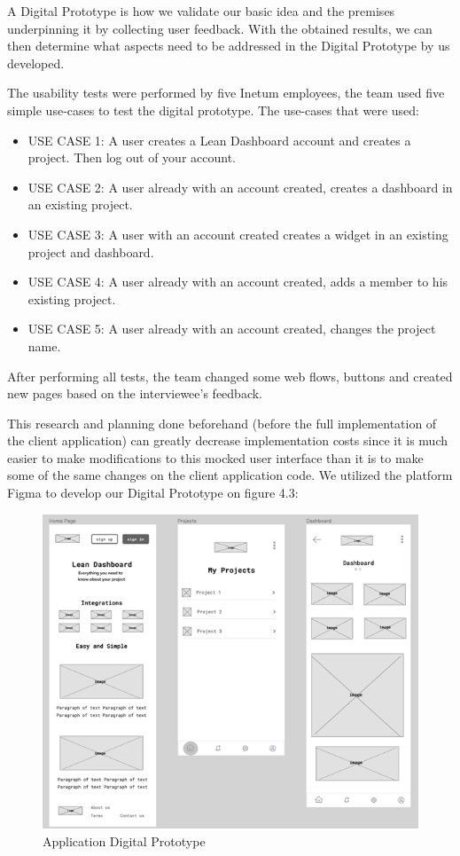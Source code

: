 \documentclass[a4paper,twoside,10pt]{report}
\begin{document}
A Digital Prototype is how we validate our basic idea and the premises underpinning it by collecting user feedback.
With the obtained results, we can then determine what aspects need to be addressed in the Digital Prototype by us developed.

The usability tests were performed by five Inetum employees, the team used five simple use-cases to test the digital prototype. The use-cases that were used: 
 \begin{itemize}
	\item USE CASE 1: A user creates a Lean Dashboard account and creates a project. Then log out of your account.
	\item USE CASE 2: A user already with an account created, creates a dashboard in an existing project.
	\item USE CASE 3: A user with an account created creates a widget in an existing project and dashboard.
	\item USE CASE 4: A user already with an account created, adds a member to his existing project.
	\item USE CASE 5: A user already with an account created, changes the project name.
\end{itemize}	

After performing all tests, the team changed some web flows, buttons and created new pages based on the interviewee's feedback. 

This research and planning done beforehand (before the full implementation of the client application) can greatly decrease implementation costs since it is much easier to make modifications to this mocked user interface than it is to make some of the same changes on the client application code.
We utilized the platform Figma\cite{FIGMA} to develop our Digital Prototype on figure 4.3:
 
\begin{figure}[h!]
\center
  \includegraphics[width=\textwidth]{digital-prototype.png}
\caption{Application Digital Prototype}
\end{figure}
\end{document}
